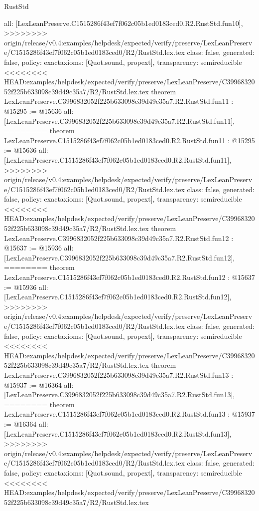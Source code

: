 \begin{lexlean}{RustStd}
\begin{coremodule}
{\begin{coremodule}
{{{{{{{{{{{{{{  all: [LexLeanPreserve.C1515286f43ef7f062c05b1ed0183ced0.R2.RustStd.fun10],
>>>>>>>> origin/release/v0.4:examples/helpdesk/expected/verify/preserve/LexLeanPreserve/C1515286f43ef7f062c05b1ed0183ced0/R2/RustStd.lex.tex
  class: false,
  generated: false,
  policy: exact{axioms: [Quot.sound, propext]},
  transparency: semireducible
}
<<<<<<<< HEAD:examples/helpdesk/expected/verify/preserve/LexLeanPreserve/C3996832052f225b633098c39d49c35a7/R2/RustStd.lex.tex
theorem LexLeanPreserve.C3996832052f225b633098c39d49c35a7.R2.RustStd.fun11 : @15295 := @15636 {
  all: [LexLeanPreserve.C3996832052f225b633098c39d49c35a7.R2.RustStd.fun11],
========
theorem LexLeanPreserve.C1515286f43ef7f062c05b1ed0183ced0.R2.RustStd.fun11 : @15295 := @15636 {
  all: [LexLeanPreserve.C1515286f43ef7f062c05b1ed0183ced0.R2.RustStd.fun11],
>>>>>>>> origin/release/v0.4:examples/helpdesk/expected/verify/preserve/LexLeanPreserve/C1515286f43ef7f062c05b1ed0183ced0/R2/RustStd.lex.tex
  class: false,
  generated: false,
  policy: exact{axioms: [Quot.sound, propext]},
  transparency: semireducible
}
<<<<<<<< HEAD:examples/helpdesk/expected/verify/preserve/LexLeanPreserve/C3996832052f225b633098c39d49c35a7/R2/RustStd.lex.tex
theorem LexLeanPreserve.C3996832052f225b633098c39d49c35a7.R2.RustStd.fun12 : @15637 := @15936 {
  all: [LexLeanPreserve.C3996832052f225b633098c39d49c35a7.R2.RustStd.fun12],
========
theorem LexLeanPreserve.C1515286f43ef7f062c05b1ed0183ced0.R2.RustStd.fun12 : @15637 := @15936 {
  all: [LexLeanPreserve.C1515286f43ef7f062c05b1ed0183ced0.R2.RustStd.fun12],
>>>>>>>> origin/release/v0.4:examples/helpdesk/expected/verify/preserve/LexLeanPreserve/C1515286f43ef7f062c05b1ed0183ced0/R2/RustStd.lex.tex
  class: false,
  generated: false,
  policy: exact{axioms: [Quot.sound, propext]},
  transparency: semireducible
}
<<<<<<<< HEAD:examples/helpdesk/expected/verify/preserve/LexLeanPreserve/C3996832052f225b633098c39d49c35a7/R2/RustStd.lex.tex
theorem LexLeanPreserve.C3996832052f225b633098c39d49c35a7.R2.RustStd.fun13 : @15937 := @16364 {
  all: [LexLeanPreserve.C3996832052f225b633098c39d49c35a7.R2.RustStd.fun13],
========
theorem LexLeanPreserve.C1515286f43ef7f062c05b1ed0183ced0.R2.RustStd.fun13 : @15937 := @16364 {
  all: [LexLeanPreserve.C1515286f43ef7f062c05b1ed0183ced0.R2.RustStd.fun13],
>>>>>>>> origin/release/v0.4:examples/helpdesk/expected/verify/preserve/LexLeanPreserve/C1515286f43ef7f062c05b1ed0183ced0/R2/RustStd.lex.tex
  class: false,
  generated: false,
  policy: exact{axioms: [Quot.sound, propext]},
  transparency: semireducible
}
<<<<<<<< HEAD:examples/helpdesk/expected/verify/preserve/LexLeanPreserve/C3996832052f225b633098c39d49c35a7/R2/RustStd.lex.tex
}}}}}}}}}}}}}}}}
\end{coremodule}}
\end{coremodule}
\end{lexlean}
